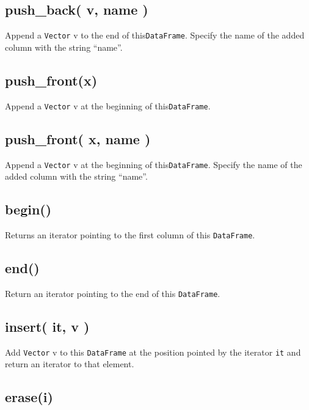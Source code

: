 \documentclass[]{book}
\begin{document}
\hypertarget{push_back-v-name}{%
\subsection{push\_back( v, name )}\label{push_back-v-name}}

Append a \texttt{Vector} v to the end of this\texttt{DataFrame}. Specify the name of the added column with the string ``name''.

\hypertarget{push_frontx}{%
\subsection{push\_front(x)}\label{push_frontx}}

Append a \texttt{Vector} v at the beginning of this\texttt{DataFrame}.

\hypertarget{push_front-x-name-1}{%
\subsection{push\_front( x, name )}\label{push_front-x-name-1}}

Append a \texttt{Vector} v at the beginning of this\texttt{DataFrame}. Specify the name of the added column with the string ``name''.

\hypertarget{begin-1}{%
\subsection{begin()}\label{begin-1}}

Returns an iterator pointing to the first column of this \texttt{DataFrame}.

\hypertarget{end-1}{%
\subsection{end()}\label{end-1}}

Return an iterator pointing to the end of this \texttt{DataFrame}.

\hypertarget{insert-it-v}{%
\subsection{insert( it, v )}\label{insert-it-v}}

Add \texttt{Vector} v to this \texttt{DataFrame} at the position pointed by the iterator \texttt{it} and return an iterator to that element.

\hypertarget{erasei-1}{%
\subsection{erase(i)}\label{erasei-1}}
\end{document}
